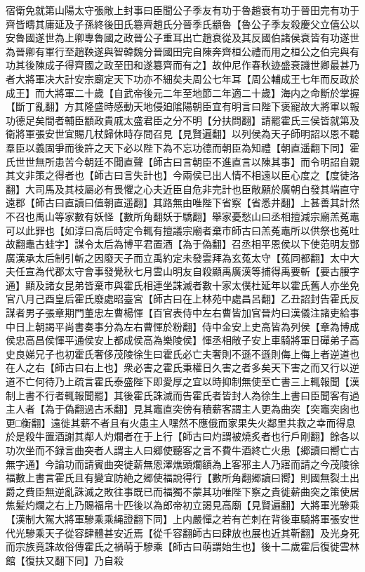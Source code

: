 宿衛免就第山陽太守張敞上封事曰臣聞公子季友有功于魯趙衰有功于晉田完有功于齊皆疇其庸延及子孫終後田氏簒齊趙氏分晉季氏顓魯【魯公子季友殺慶父立僖公以安魯國遂世為上卿專魯國之政晉公子重耳出亡趙衰從及其反國伯諸侯衰皆有功遂世為晉卿有軍行至趙鞅遂與智韓魏分晉國田完自陳奔齊桓公禮而用之桓公之伯完與有功其後陳成子得齊國之政至田和遂簒齊而有之】故仲尼作春秋迹盛衰譏世卿最甚乃者大將軍决大計安宗廟定天下功亦不細矣夫周公七年耳【周公輔成王七年而反政於成王】而大將軍二十歲【自武帝後元二年至地節二年適二十歲】海内之命斷於掌握【斷丁亂翻】方其隆盛時感動天地侵廹隂陽朝臣宜有明言曰陛下褒寵故大將軍以報功德足矣間者輔臣顓政貴戚太盛君臣之分不明【分扶問翻】請罷霍氏三侯皆就第及衛將軍張安世宜賜几杖歸休時存問召見【見賢遍翻】以列侯為天子師明詔以恩不聽羣臣以義固爭而後許之天下必以陛下為不忘功德而朝臣為知禮【朝直遥翻下同】霍氏世世無所患苦今朝廷不聞直聲【師古曰言朝臣不進直言以陳其事】而令明詔自親其文非策之得者也【師古曰言失計也】今兩侯已出人情不相遠以臣心度之【度徒洛翻】大司馬及其枝屬必有畏懼之心夫近臣自危非完計也臣敞願於廣朝白發其端直守遠郡【師古曰直讀曰值朝直遥翻】其路無由唯陛下省察【省悉井翻】上甚善其計然不召也禹山等家數有妖怪【數所角翻妖于驕翻】舉家憂愁山曰丞相擅減宗廟羔菟鼃可以此罪也【如淳曰高后時定令輒有擅議宗廟者棄市師古曰羔菟鼃所以供祭也菟吐故翻鼃古蛙字】謀令太后為博平君置酒【為于偽翻】召丞相平恩侯以下使范明友鄧廣漢承太后制引斬之因廢天子而立禹約定未發雲拜為玄菟太守【菟同都翻】太中大夫任宣為代郡太守會事發覺秋七月雲山明友自殺顯禹廣漢等捕得禹要斬【要古腰字通】顯及諸女昆弟皆棄市與霍氏相連坐誅滅者數十家太僕杜延年以霍氏舊人亦坐免官八月己酉皇后霍氏廢處昭臺宮【師古曰在上林苑中處昌呂翻】乙丑詔封告霍氏反謀者男子張章期門董忠左曹楊惲【百官表侍中左右曹皆加官晉灼曰漢儀注諸吏給事中日上朝謁平尚書奏事分為左右曹惲於粉翻】侍中金安上史高皆為列侯【章為博成侯忠高昌侯惲平通侯安上都成侯高為樂陵侯】惲丞相敞子安上車騎將軍日磾弟子高史良娣兄子也初霍氏奢侈茂陵徐生曰霍氏必亡夫奢則不遜不遜則侮上侮上者逆道也在人之右【師古曰右上也】衆必害之霍氏秉權日久害之者多矣天下害之而又行以逆道不亡何待乃上疏言霍氏泰盛陛下即愛厚之宜以時抑制無使至亡書三上輒報聞【漢制上書不行者輒報聞罷】其後霍氏誅滅而告霍氏者皆封人為徐生上書曰臣聞客有過主人者【為于偽翻過古禾翻】見其竈直突傍有積薪客謂主人更為曲突【突竈突囱也更□衡翻】遠徙其薪不者且有火患主人嘿然不應俄而家果失火鄰里共救之幸而得息於是殺牛置酒謝其鄰人灼爛者在于上行【師古曰灼謂被燒炙者也行戶剛翻】餘各以功次坐而不録言曲突者人謂主人曰郷使聽客之言不費牛酒終亡火患【郷讀曰嚮亡古無字通】今論功而請賓曲突徙薪無恩澤燋頭爛額為上客邪主人乃寤而請之今茂陵徐福數上書言霍氏且有變宜防絶之郷使福說得行【數所角翻郷讀曰嚮】則國無裂土出爵之費臣無逆亂誅滅之敗往事既已而福獨不蒙其功唯陛下察之貴徙薪曲突之策使居焦髪灼爛之右上乃賜福帛十匹後以為郎帝初立謁見高廟【見賢遍翻】大將軍光驂乘【漢制大駕大將軍驂乘乘䋲證翻下同】上内嚴憚之若有芒刺在背後車騎將軍張安世代光驂乘天子從容肆體甚安近焉【從千容翻師古曰肆放也展也近其靳翻】及光身死而宗族竟誅故俗傳霍氏之禍萌于驂乘【師古曰萌謂始生也】後十二歲霍后復徙雲林館【復扶又翻下同】乃自殺

